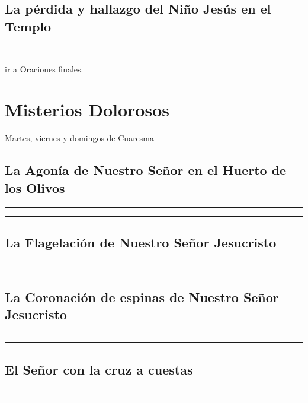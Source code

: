 \documentclass[11pt,a4paper]{book}
\begin{document}
    \subsection{La pérdida y hallazgo del Niño Jesús en el Templo}
    
    
    \rule{\textwidth}{0.5pt}
    
    \rule{\textwidth}{0.5pt}
    

    ir a Oraciones finales.

    \newpage    

    \section{Misterios Dolorosos}
    Martes, viernes y domingos de Cuaresma

    \subsection{La Agonía de Nuestro Señor en el Huerto de los Olivos}
    
    
    \rule{\textwidth}{0.5pt}
    
    \rule{\textwidth}{0.5pt}
    

    \subsection{La Flagelación de Nuestro Señor Jesucristo}
    
    
    \rule{\textwidth}{0.5pt}
    
    \rule{\textwidth}{0.5pt}
    

    \subsection{La Coronación de espinas de Nuestro Señor Jesucristo}
    
    
    \rule{\textwidth}{0.5pt}
    
    \rule{\textwidth}{0.5pt}
    

    \subsection{El Señor con la cruz a cuestas}
    
    
    \rule{\textwidth}{0.5pt}
    
    \rule{\textwidth}{0.5pt}
    
\end{document}
